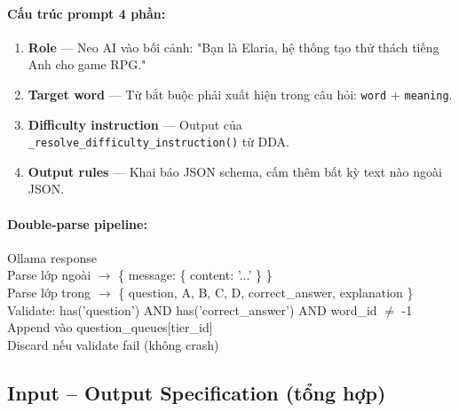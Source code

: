 \paragraph{Cấu trúc prompt 4 phần:}
\begin{enumerate}
    \item \textbf{Role} — Neo AI vào bối cảnh: "Bạn là Elaria, hệ thống tạo thử thách tiếng Anh cho game RPG."
    \item \textbf{Target word} — Từ bắt buộc phải xuất hiện trong câu hỏi: \texttt{word} + \texttt{meaning}.
    \item \textbf{Difficulty instruction} — Output của \texttt{\_resolve\_difficulty\_instruction()} từ DDA.
    \item \textbf{Output rules} — Khai báo JSON schema, cấm thêm bất kỳ text nào ngoài JSON.
\end{enumerate}

\paragraph{Double-parse pipeline:}
\noindent Ollama response \\
\hspace*{1.5em} Parse lớp ngoài $\rightarrow$ \{ message: \{ content: '...' \} \} \\
\hspace*{3.0em} Parse lớp trong $\rightarrow$ \{ question, A, B, C, D, correct\_answer, explanation \} \\
\hspace*{4.5em} Validate: has('question') AND has('correct\_answer') AND word\_id $\neq$ -1 \\
\hspace*{6.0em} Append vào question\_queues[tier\_id] \hspace{0.5em} \textcolor{green}{} \\
\hspace*{6.0em} Discard nếu validate fail \hspace{5.5em} \textcolor{red}{} (không crash)

\newpage

\subsection{Input – Output Specification (tổng hợp)}


